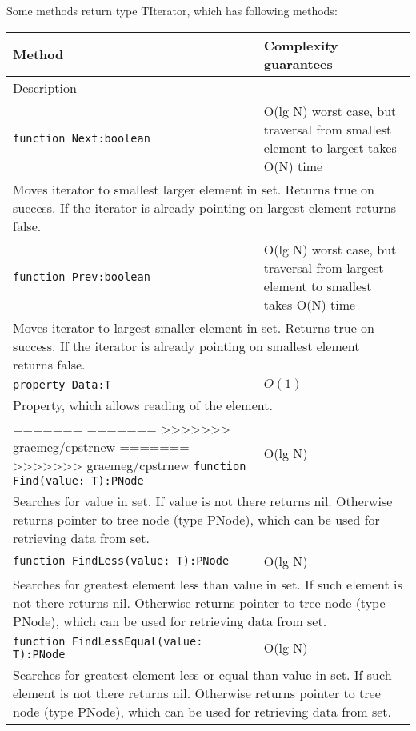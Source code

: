 Some methods return type TIterator, which has following methods:
\begin{longtable}{|m{10cm}|m{5cm}|}                                                             
\hline
Method & Complexity guarantees \\ \hline                                                  
\multicolumn{2}{|m{15cm}|}{Description} \\ \hline\hline                                               
\verb!function Next:boolean! & O(lg N) worst case, but traversal from smallest element to
largest takes O(N) time \\\hline
\multicolumn{2}{|m{15cm}|}{Moves iterator to smallest larger element in set. Returns true on
success. If the iterator is already pointing on largest element returns false.} \\\hline\hline

\verb!function Prev:boolean! & O(lg N) worst case, but traversal from largest element to
smallest takes O(N) time \\\hline
\multicolumn{2}{|m{15cm}|}{Moves iterator to largest smaller element in set. Returns true on
success. If the iterator is already pointing on smallest element returns false.} \\\hline\hline

\verb!property Data:T! & $O(1)$ \\\hline
\multicolumn{2}{|m{15cm}|}{Property, which allows reading of the element.} \\\hline
=======
=======
>>>>>>> graemeg/cpstrnew
=======
>>>>>>> graemeg/cpstrnew
\verb!function Find(value: T):PNode! & O(lg N) \\\hline
\multicolumn{2}{|m{15cm}|}{Searches for value in set. If value is not there returns nil. Otherwise
returns pointer to tree node (type PNode), which can be used for retrieving data from set.} \\\hline\hline

\verb!function FindLess(value: T):PNode! & O(lg N) \\\hline
\multicolumn{2}{|m{15cm}|}{Searches for greatest element less than value in set. If such element is not there returns nil. Otherwise
returns pointer to tree node (type PNode), which can be used for retrieving data from set.} \\\hline\hline

\verb!function FindLessEqual(value: T):PNode! & O(lg N) \\\hline
\multicolumn{2}{|m{15cm}|}{Searches for greatest element less or equal than value in set. If such element is not there returns nil. Otherwise
returns pointer to tree node (type PNode), which can be used for retrieving data from set.} \\\hline\hline


\end{longtable}
